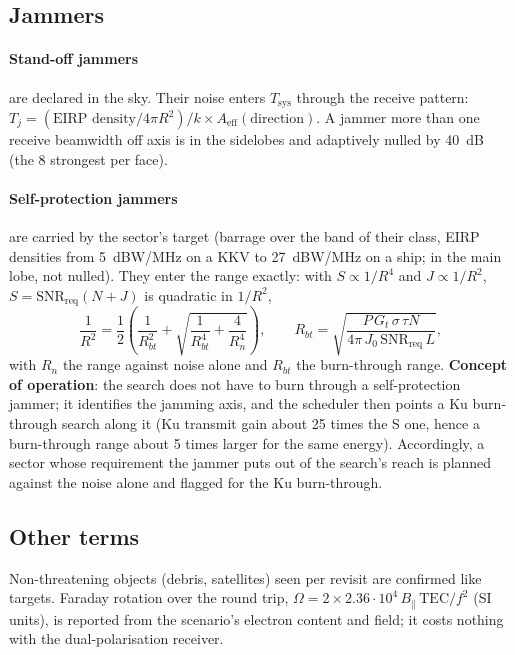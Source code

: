\documentclass[11pt,a4paper]{article}
\newcommand{\Tsys}{T_{\mathrm{sys}}}
\newcommand{\SNR}{\mathrm{SNR}}
\begin{document}
\subsection{Jammers}
\paragraph{Stand-off jammers} are declared in the sky. Their noise enters $\Tsys$ through the receive pattern:
$T_j = (\text{EIRP density}/4\pi R^2)/k \times A_{\mathrm{eff}}(\text{direction})$. A jammer more than one receive
beamwidth off axis is in the sidelobes and adaptively nulled by \SI{40}{dB} (the 8 strongest per face).

\paragraph{Self-protection jammers} are carried by the sector's target (barrage over the band of their class, EIRP
densities from \SI{5}{dBW/MHz} on a KKV to \SI{27}{dBW/MHz} on a ship; in the main lobe, not nulled). They enter the
range exactly: with $S \propto 1/R^4$ and $J \propto 1/R^2$, $S = \SNR_{\mathrm{req}}(N + J)$ is quadratic in
$1/R^2$,
\[
  \frac{1}{R^2} = \frac12\left(\frac{1}{R_{bt}^2} + \sqrt{\frac{1}{R_{bt}^4} + \frac{4}{R_n^4}}\right),\qquad
  R_{bt} = \sqrt{\frac{P\,G_t\,\sigma\,\tau N}{4\pi\,J_0\,\SNR_{\mathrm{req}}\,L}},
\]
with $R_n$ the range against noise alone and $R_{bt}$ the burn-through range. \textbf{Concept of operation}: the
search does not have to burn through a self-protection jammer; it identifies the jamming axis, and the scheduler then
points a Ku burn-through search along it (Ku transmit gain about 25 times the S one, hence a burn-through range about
5 times larger for the same energy). Accordingly, a sector whose requirement the jammer puts out of the search's reach
is planned against the noise alone and flagged for the Ku burn-through.

\subsection{Other terms}
Non-threatening objects (debris, satellites) seen per revisit are confirmed like targets. Faraday rotation over the
round trip, $\Omega = 2\times2.36\cdot10^4\,B_\parallel\,\mathrm{TEC}/f^2$ (SI units), is reported from the scenario's
electron content and field; it costs nothing with the dual-polarisation receiver.

\end{document}
